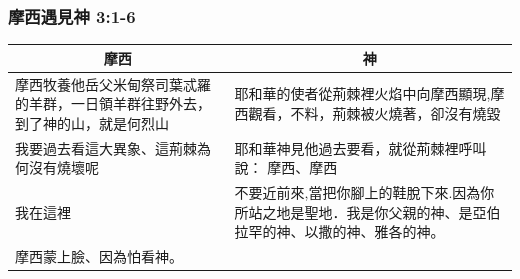 \subsubsection{摩西遇見神 3:1-6}
\begin{table}[H]
\centering
\begin{tabular}{p{7.5cm}|p{9.50cm}}\hline\hline
\multicolumn{1}{c|}{摩西}&\multicolumn{1}{c}{神}\\\hline
摩西牧養他岳父米甸祭司葉忒羅的羊群，一日領羊群往野外去，到了神的山，就是何烈山 & 耶和華的使者從荊棘裡火焰中向摩西顯現,摩西觀看，不料，荊棘被火燒著，卻沒有燒毀\\\hline
我要過去看這大異象、這荊棘為何沒有燒壞呢 &耶和華神見他過去要看，就從荊棘裡呼叫說： 摩西、摩西\\\hline
我在這裡&不要近前來,當把你腳上的鞋脫下來.因為你所站之地是聖地．我是你父親的神、是亞伯拉罕的神、以撒的神、雅各的神。\\\hline
摩西蒙上臉、因為怕看神。&\\\hline
\end{tabular}
\end{table}



